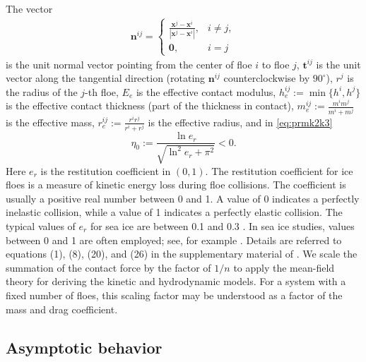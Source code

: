 \documentclass[a4paper,11pt]{article}
\numberwithin{equation}{section}
\theoremstyle{definition}
\newcommand{\bfx}{\boldsymbol{x}}
\newcommand{\bfzr}{\boldsymbol{0}}
\newcommand{\bfn}{\boldsymbol{n}}
\newcommand{\bft}{\boldsymbol{t}}
\begin{document}
The vector 
\begin{align} \label{eq:n}
    \bfn^{ij} =  
    \begin{cases}
        \frac{\bfx^j-\bfx^i}{|\bfx^j-\bfx^i|}, & i\ne j,\\
        \bfzr, &  i=j
    \end{cases}
\end{align}
 is the unit normal vector pointing from the center of floe $i$ to floe $j$, 
$\bft^{ij}$ is the unit vector along the tangential direction (rotating $\bfn^{ij}$ counterclockwise by $90^\circ$),  $r^j$ is the radius of the $j$-th floe,
$E_e$ is the effective contact modulus, $h^{ij}_e:= \min\{h^i, h^j\}$ is the effective contact thickness (part of the thickness in contact), $m^{ij}_e := \frac{m^i m^j}{m^i + m^j}$ is the effective mass, $r^{ij}_e := \frac{r^i r^j}{r^i + r^j}$ is the effective radius, and in \eqref{eq:prmk2k3}
\begin{equation} \label{eq:beta}
\eta_0 := \frac{\ln e_r}{\sqrt{\ln^2 e_r + \pi^2} } < 0.
\end{equation}
Here $e_r$ is the restitution coefficient in $(0, 1)$. The restitution coefficient for ice floes is a measure of kinetic energy loss during floe collisions. The coefficient is usually a positive real number between 0 and 1. A value of 0 indicates a perfectly inelastic collision, while a value of 1 indicates a perfectly elastic collision. The typical values of $e_r$  for sea ice are between 0.1 and 0.3 \cite{li2020laboratory}. In sea ice studies, values between 0 and 1 are often employed; see, for example \cite{herman2019wave}. 
 Details are referred to equations (1), (8), (20), and (26) in the supplementary material of \cite{herman2016discrete}.
%
We scale the summation of the contact force by the factor of $1/n$ to apply the mean-field theory for deriving the kinetic and hydrodynamic models.
For a system with a fixed number of floes, this scaling factor may be understood as a factor of the mass and drag coefficient.

\color{black}


\subsection{Asymptotic behavior} \label{sec:pmodelab}
\end{document}
